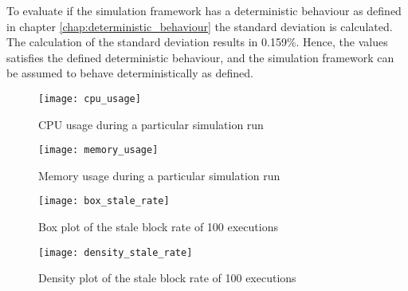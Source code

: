 To evaluate if the simulation framework has a deterministic behaviour as defined in chapter \ref{chap:deterministic_behaviour} the standard deviation is calculated.
The calculation of the standard deviation results in 0.159\%.
Hence, the values satisfies the defined deterministic behaviour, and the simulation framework can be assumed to behave deterministically as defined.

\begin{figure}[t]
\texttt{[image: cpu\_usage]}
\centering
\caption{CPU usage during a particular simulation run}
\label{fig:cpu_usage}
\end{figure}

\begin{figure}[t]
\texttt{[image: memory\_usage]}
\centering
\caption{Memory usage during a particular simulation run}
\label{fig:storage_usage}
\end{figure}

\begin{figure}[t]
\texttt{[image: box\_stale\_rate]}
\centering
\caption{Box plot of the stale block rate of 100 executions}
\label{fig:box_stale_rate}
\end{figure}

\begin{figure}[t]
\texttt{[image: density\_stale\_rate]}
\centering
\caption{Density plot of the stale block rate of 100 executions}
\label{fig:density_stale_rate}
\end{figure}
